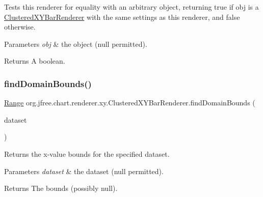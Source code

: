 Tests this renderer for equality with an arbitrary object, returning {\ttfamily true} if {\ttfamily obj} is a {\ttfamily \mbox{\hyperlink{classorg_1_1jfree_1_1chart_1_1renderer_1_1xy_1_1_clustered_x_y_bar_renderer}{Clustered\+X\+Y\+Bar\+Renderer}}} with the same settings as this renderer, and {\ttfamily false} otherwise.


\begin{DoxyParams}{Parameters}
{\em obj} & the object ({\ttfamily null} permitted).\\
\hline
\end{DoxyParams}
\begin{DoxyReturn}{Returns}
A boolean. 
\end{DoxyReturn}
\mbox{\label{classorg_1_1jfree_1_1chart_1_1renderer_1_1xy_1_1_clustered_x_y_bar_renderer_a47251aac68f79159a1c5206e79d17341}} 
\subsubsection{\texorpdfstring{find\+Domain\+Bounds()}{findDomainBounds()}}
{\footnotesize\ttfamily \mbox{\hyperlink{classorg_1_1jfree_1_1data_1_1_range}{Range}} org.\+jfree.\+chart.\+renderer.\+xy.\+Clustered\+X\+Y\+Bar\+Renderer.\+find\+Domain\+Bounds (\begin{DoxyParamCaption}\item[{\mbox{\hyperlink{interfaceorg_1_1jfree_1_1data_1_1xy_1_1_x_y_dataset}{X\+Y\+Dataset}}}]{dataset }\end{DoxyParamCaption})}

Returns the x-\/value bounds for the specified dataset.


\begin{DoxyParams}{Parameters}
{\em dataset} & the dataset ({\ttfamily null} permitted).\\
\hline
\end{DoxyParams}
\begin{DoxyReturn}{Returns}
The bounds (possibly {\ttfamily null}). 
\end{DoxyReturn}


